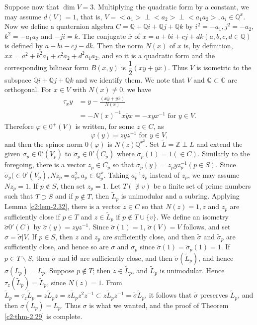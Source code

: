 Suppose now that $\dim V=3$. Multiplying the quadratic form by a
constant, we may assume $d(V)=1$, that is, $V=<a_1>\perp <a_2> \perp
<a_1 a_2>, a_i\in \mathbb{Q}^{x}$. Now we define a quaternion
algebra $C=\mathbb{Q} + \mathbb{Q} i + \mathbb{Q}j + \mathbb{Q}k$ by
$i^2 = -a_1, j^2=-a_2$, $k^2 = -a_1 a_2$ and $-ji=k$. The conjugate
$\overline{x}$ of $x=a+bi+cj+dk (a,b,c,d \in \mathbb{Q})$ is
defined by $a-bi-cj-dk$. Then the norm $N(x)$ of $x$ is, by
definition, $x\overline{x}=a^2+b^2a_1+c^2a_2+d^2a_1a_2$, and so it is
a quadratic form and the corresponding bilinear form $B(x,y)$ is
$\dfrac{1}{2} (x\overline{y} + y \overline{x})$. Thus $V$ is
isometric to the subspace $\mathbb{Q}i+ \mathbb{Q}j + \mathbb{Q}k$ and
we identify them. We note that $V$ and $\mathbb{Q} \subset \mathbb{C}$
are orthogonal. For $x\in V$ with $N(x)\neq 0$, we have 
\begin{align*}
\tau_x y & = y -\frac{(x\overline{y} + y \overline{x})}{N(x)}\\
& = -N(x)^{-1} x \overline{y} x = -x y x^{-1} \text{ for }
y \in V.
\end{align*}\pageoriginale 
Therefore $\varphi \in 0^+(V)$ is written, for some
$z\in C$, as 
$$
\varphi(y) = z y z^{-1} \text{ for } y \in V,
$$
and then the spinor norm $0(\varphi)$ is $N(z)\mathbb{Q}^{x^2}$. Set
$\widetilde{L} = \mathbb{Z} \perp L$ and extend the given
$\sigma_p \in 0'(V_p)$ to $\widetilde{\sigma}_p \in
0'(C_p)$ where $\widetilde{\sigma}_p(1)=1(\in C)$. Similarly to
the foregoing, there is a vector $z_p \in C_p$ so that
$\widetilde{\sigma}_p(y)=z_pyz^{-1}_p(p\in S)$. Since
$\widetilde{\sigma}_p(\in 0' (V_p), Nz_p = a^2_p,
a_p \in \mathbb{Q}^x_p$. Taking $a^{-1}_p z_p$ instead of
$z_p$, we may assume $N z_p=1$. If $p\not\in S$, then set $z_p=1$. Let
$T(\not\ni v)$ be a finite set of prime numbers such that $T\supset S$
and if $p \not\in T$, then $\widetilde{L}_p$ is unimodular and a
subring. Applying Lemma \ref{c2:lem-2.32}, there is a vector $z\in C$ so
that $N(z)=1,z$ and $z_p$ are sufficiently close if $p\in T$
and $z\in \widetilde{L}_p$ if $p\not\in T\cup \{v\}$. We
define an isometry $\widetilde{\sigma} 0'(C)$ by
$\widetilde{\sigma}(y)=zyz^{-1}$. Since $\widetilde{\sigma}(1)=1$,
$\widetilde{\sigma}(V)=V$ follows, and set
$\sigma=\widetilde{\sigma}|V$. If $p\in S$, then $z$ and $z_p$
are sufficiently close, and then $\widetilde{\sigma}$ and
$\widetilde{\sigma}_p$ are sufficiently close, and hence so are
$\sigma$ and $\sigma_p$ since
$\widetilde{\sigma}(1)=\widetilde{\sigma}_p(1)=1$. If $p\in
T\backslash S$, then $\widetilde{\sigma}$ and $\operatorname{id}$ are sufficiently
close, and then $\widetilde{\sigma}(\widetilde{L}_p)$, and hence
$\sigma(L_p)=L_p$. Suppose $p\not\in T$; then
$z \in \widetilde{L}_p$, and $\widetilde{L}_p$ is
unimodular. Hence $\tau_z(\widetilde{L}_p)=\widetilde{L}_p$, since
$N(z)=1$. From $\widetilde{L}_p=\tau_z \widetilde{L}_p =
z \widetilde{L}_p z = z \widetilde{L}_p z^2 z^{-1} \subset
z \widetilde{L}_p z^{-1}=\widetilde{\sigma}\widetilde{L}_p$, it
follows that $\widetilde{\sigma}$ preserves $\widetilde{L}_p$, and
then $\sigma(L_p)=L_p$. Thus $\sigma$ is what we wanted, and the proof
of Theorem \ref{c2:thm-2.29} is complete.

